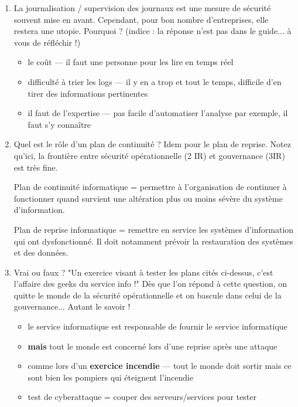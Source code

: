 \documentclass[a4paper]{article}
\begin{document}
\begin{enumerate}
\item La journalisation / supervision des journaux est une mesure de sécurité souvent mise en avant. Cependant, pour bon nombre d'entreprises, elle restera une utopie. Pourquoi ? (indice : la réponse n'est pas dans le guide... à vous de réfléchir !)
\begin{example}
    \begin{itemize}
        \item le coût --- il faut une personne pour les lire en temps réel
        \item difficulté à trier les logs --- il y en a trop et tout le temps, difficile d'en tirer des informations pertinentes
        \item il faut de l'expertise --- pas facile d'automatiser l'analyse par exemple, il faut s'y connaître
    \end{itemize}
\end{example}



\item Quel est le rôle d'un plan de continuité ? Idem pour le plan de reprise. Notez qu'ici, la frontière entre sécurité opérationnelle (2 IR) et gouvernance (3IR) est très fine.
\begin{example}
    Plan de continuité informatique = permettre à l'organisation de continuer à fonctionner quand survient une altération plus ou moins sévère du système d’information.

    Plan de reprise informatique = remettre en service les systèmes d’information qui ont dysfonctionné. Il doit notamment prévoir la restauration des systèmes et des données.
\end{example}



\item Vrai ou faux ? "Un exercice visant à tester les plans cités ci-dessus, c'est l'affaire des geeks du service info !" Dès que l'on répond à cette question, on quitte le monde de la sécurité opérationnelle et on bascule dans celui de la gouvernance... Autant le savoir !
\begin{example}
    \begin{itemize}
        \item le service informatique est responsable de fournir le service informatique
        \item \textbf{mais} tout le monde est concerné lors d'une reprise après une attaque
        \item comme lors d'un \textbf{exercice incendie} --- tout le monde doit sortir mais ce sont bien les pompiers qui éteignent l'incendie
        \item test de cyberattaque = couper des serveurs/services pour tester
    \end{itemize}
\end{example}




\end{enumerate}
\end{document}
